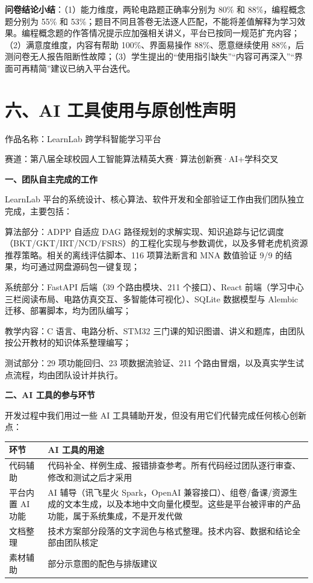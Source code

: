 \documentclass[zihao=-4,a4paper,UTF8,fontset=windows]{ctexart}
\begin{document}
\textbf{问卷结论小结}：（1）能力维度，两轮电路题正确率分别为 80\% 和 88\%，编程概念题分别为 55\% 和 53\%；题目不同且答卷无法逐人匹配，不能将差值解释为学习效果。编程概念题的作答情况提示应加强相关讲义，平台已按同一规范扩充内容；（2）满意度维度，内容有帮助 100\%、界面易操作 88\%、愿意继续使用 88\%，后测问卷无人报告阻断性故障；（3）学生提出的“使用指引缺失”“内容可再深入”“界面可再精简”建议已纳入平台迭代。


\section{六、AI 工具使用与原创性声明}

作品名称：LearnLab 跨学科智能学习平台

赛道：第八届全球校园人工智能算法精英大赛·算法创新赛·AI+学科交叉

\textbf{一、团队自主完成的工作}

LearnLab 平台的系统设计、核心算法、软件开发和全部验证工作由我们团队独立完成，主要包括：

算法部分：ADPP 自适应 DAG 路径规划的求解实现、知识追踪与记忆调度（BKT/GKT/IRT/NCD/FSRS）的工程化实现与参数调优，以及多臂老虎机资源推荐策略。相关的离线评估脚本、116 项算法断言和 MNA 数值验证 9/9 的结果，均可通过网盘源码包一键复现；

系统部分：FastAPI 后端（39 个路由模块、211 个接口）、React 前端（学习中心三栏阅读布局、电路仿真交互、多智能体可视化）、SQLite 数据模型与 Alembic 迁移、部署脚本，均为团队编写；

教学内容：C 语言、电路分析、STM32 三门课的知识图谱、讲义和题库，由团队按公开教材的知识体系整理编写；

测试部分：29 项功能回归、23 项数据流验证、211 个路由冒烟，以及真实学生试点流程，均由团队设计并执行。

\textbf{二、AI 工具的参与环节}

开发过程中我们用过一些 AI 工具辅助开发，但没有用它们代替完成任何核心创新点：

\par\noindent\begin{tabular}{|p{3.4cm}|p{10.6cm}|}
\hline
\textbf{环节} & \textbf{AI 工具的用途} \\ \hline
代码辅助 & 代码补全、样例生成、报错排查参考。所有代码经过团队逐行审查、修改和测试之后才采用 \\ \hline
平台内置 AI 功能 & AI 辅导（讯飞星火 Spark，OpenAI 兼容接口）、组卷/备课/资源生成的文本生成，以及本地中文向量化模型。这些是平台被评审的产品功能，属于系统集成，不是开发代做 \\ \hline
文档整理 & 技术方案部分段落的文字润色与格式整理。技术内容、数据和结论全部由团队核定 \\ \hline
素材辅助 & 部分示意图的配色与排版建议 \\ \hline
\end{tabular}\par
\end{document}
